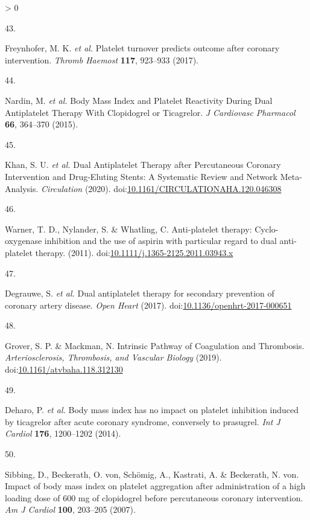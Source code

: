 \documentclass[11pt,twoside]{bristolthesis}
\newlength{\cslhangindent}
\newlength{\csllabelwidth}
\newenvironment{CSLReferences}[2] %
 {%
  \setlength{\parindent}{0pt}
  \ifodd #1 \everypar{\setlength{\hangindent}{\cslhangindent}}\ignorespaces\fi
  \ifnum #2 > 0
  \setlength{\parskip}{#2\baselineskip}
  \fi
 }%
 {}
\newcommand{\CSLLeftMargin}[1]{\parbox[t]{\csllabelwidth}{#1}}
\newcommand{\CSLRightInline}[1]{\parbox[t]{\linewidth - \csllabelwidth}{#1}\break}
\begin{document}
\begin{CSLReferences}{0}{0}
\leavevmode\hypertarget{ref-Freynhofer2017a}{}%
\CSLLeftMargin{43. }
\CSLRightInline{Freynhofer, M. K. \emph{et al.} {Platelet turnover predicts outcome after coronary intervention}. \emph{Thromb Haemost} \textbf{117}, 923--933 (2017).}

\leavevmode\hypertarget{ref-Nardin2015}{}%
\CSLLeftMargin{44. }
\CSLRightInline{Nardin, M. \emph{et al.} {Body Mass Index and Platelet Reactivity During Dual Antiplatelet Therapy With Clopidogrel or Ticagrelor}. \emph{J Cardiovasc Pharmacol} \textbf{66}, 364--370 (2015).}

\leavevmode\hypertarget{ref-Khan2020}{}%
\CSLLeftMargin{45. }
\CSLRightInline{Khan, S. U. \emph{et al.} {Dual Antiplatelet Therapy after Percutaneous Coronary Intervention and Drug-Eluting Stents: A Systematic Review and Network Meta-Analysis}. \emph{Circulation} (2020). doi:\href{https://doi.org/10.1161/CIRCULATIONAHA.120.046308}{10.1161/CIRCULATIONAHA.120.046308}}

\leavevmode\hypertarget{ref-Warner2011}{}%
\CSLLeftMargin{46. }
\CSLRightInline{Warner, T. D., Nylander, S. \& Whatling, C. {Anti-platelet therapy: Cyclo-oxygenase inhibition and the use of aspirin with particular regard to dual anti-platelet therapy}. (2011). doi:\href{https://doi.org/10.1111/j.1365-2125.2011.03943.x}{10.1111/j.1365-2125.2011.03943.x}}

\leavevmode\hypertarget{ref-Degrauwe2017}{}%
\CSLLeftMargin{47. }
\CSLRightInline{Degrauwe, S. \emph{et al.} {Dual antiplatelet therapy for secondary prevention of coronary artery disease}. \emph{Open Heart} (2017). doi:\href{https://doi.org/10.1136/openhrt-2017-000651}{10.1136/openhrt-2017-000651}}

\leavevmode\hypertarget{ref-Grover2019}{}%
\CSLLeftMargin{48. }
\CSLRightInline{Grover, S. P. \& Mackman, N. {Intrinsic Pathway of Coagulation and Thrombosis}. \emph{Arteriosclerosis, Thrombosis, and Vascular Biology} (2019). doi:\href{https://doi.org/10.1161/atvbaha.118.312130}{10.1161/atvbaha.118.312130}}

\leavevmode\hypertarget{ref-Deharo2014}{}%
\CSLLeftMargin{49. }
\CSLRightInline{Deharo, P. \emph{et al.} {Body mass index has no impact on platelet inhibition induced by ticagrelor after acute coronary syndrome, conversely to prasugrel}. \emph{Int J Cardiol} \textbf{176}, 1200--1202 (2014).}

\leavevmode\hypertarget{ref-Sibbing2007}{}%
\CSLLeftMargin{50. }
\CSLRightInline{Sibbing, D., Beckerath, O. von, Schömig, A., Kastrati, A. \& Beckerath, N. von. {Impact of body mass index on platelet aggregation after administration of a high loading dose of 600 mg of clopidogrel before percutaneous coronary intervention}. \emph{Am J Cardiol} \textbf{100}, 203--205 (2007).}


\end{CSLReferences}
\end{document}
